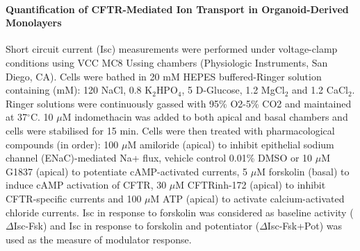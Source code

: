\paragraph{Quantification of CFTR-Mediated Ion Transport in Organoid-Derived Monolayers} Short circuit current (Isc) measurements were performed under voltage-clamp conditions using VCC MC8 Ussing chambers (Physiologic Instruments, San Diego, CA). Cells were bathed in 20 mM HEPES buffered-Ringer solution containing (mM): 120 NaCl, 0.8 K$_2$HPO$_4$, 5 D-Glucose, 1.2 MgCl$_2$ and 1.2 CaCl$_2$. Ringer solutions were continuously gassed with 95\% O2-5\% CO2 and maintained at 37$^\circ$C. 10 $\mu$M indomethacin was added to both apical and basal chambers and cells were stabilised for 15 min. Cells were then treated with pharmacological compounds (in order): 100 $\mu$M amiloride (apical) to inhibit epithelial sodium channel (ENaC)-mediated Na+ flux, vehicle control 0.01\% DMSO or 10 $\mu$M G1837 (apical) to potentiate cAMP-activated currents, 5 $\mu$M forskolin (basal) to induce cAMP activation of CFTR, 30 $\mu$M CFTRinh-172 (apical) to inhibit CFTR-specific currents and 100 $\mu$M ATP (apical) to activate calcium-activated chloride currents. Isc in response to forskolin was considered as baseline activity ($\Delta$Isc-Fsk) and Isc in response to forskolin and potentiator ($\Delta$Isc-Fsk+Pot) was used as the measure of modulator response.

